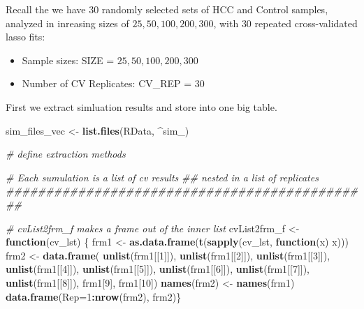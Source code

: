 \documentclass[
]{book}
\newenvironment{Shaded}{\begin{snugshade}}{\end{snugshade}}
\newcommand{\CommentTok}[1]{\textcolor[rgb]{0.56,0.35,0.01}{\textit{#1}}}
\newcommand{\ControlFlowTok}[1]{\textcolor[rgb]{0.13,0.29,0.53}{\textbf{#1}}}
\newcommand{\DataTypeTok}[1]{\textcolor[rgb]{0.13,0.29,0.53}{#1}}
\newcommand{\DecValTok}[1]{\textcolor[rgb]{0.00,0.00,0.81}{#1}}
\newcommand{\KeywordTok}[1]{\textcolor[rgb]{0.13,0.29,0.53}{\textbf{#1}}}
\newcommand{\NormalTok}[1]{#1}
\newcommand{\OperatorTok}[1]{\textcolor[rgb]{0.81,0.36,0.00}{\textbf{#1}}}
\newcommand{\StringTok}[1]{\textcolor[rgb]{0.31,0.60,0.02}{#1}}
\begin{document}
Recall the we have \(30\) randomly selected sets of HCC and Control samples,
analyzed in inreasing sizes of \(25, 50, 100, 200, 300\), with
\(30\) repeated cross-validated lasso fits:

\begin{itemize}
\item
  Sample sizes: SIZE = \(25, 50, 100, 200, 300\)
\item
  Number of CV Replicates: CV\_REP = \(30\)
\end{itemize}

First we extract simluation results and store into one big table.

\begin{Shaded}
\begin{Highlighting}[]
\NormalTok{sim\_files\_vec <{-}}\StringTok{ }\KeywordTok{list.files}\NormalTok{(}\StringTok{\textquotesingle{}RData\textquotesingle{}}\NormalTok{, }\StringTok{\textquotesingle{}\^{}sim\_\textquotesingle{}}\NormalTok{)}


\CommentTok{\# define extraction methods}

\CommentTok{\# Each sumulation is a list of cv results }
\CommentTok{\#\# nested in a list of replicates}
\CommentTok{\#\#\#\#\#\#\#\#\#\#\#\#\#\#\#\#\#\#\#\#\#\#\#\#\#\#\#\#\#\#\#\#\#\#\#\#\#\#\#\#\#\#\#\#\#\#}

\CommentTok{\# cvList2frm\_f makes a frame out of the inner list}
\NormalTok{cvList2frm\_f <{-}}\StringTok{ }\ControlFlowTok{function}\NormalTok{(cv\_lst) \{}
\NormalTok{ frm1 <{-}}\StringTok{ }\KeywordTok{as.data.frame}\NormalTok{(}\KeywordTok{t}\NormalTok{(}\KeywordTok{sapply}\NormalTok{(cv\_lst, }\ControlFlowTok{function}\NormalTok{(x) x)))}
\NormalTok{ frm2 <{-}}\StringTok{ }\KeywordTok{data.frame}\NormalTok{(}
  \KeywordTok{unlist}\NormalTok{(frm1[[}\DecValTok{1}\NormalTok{]]), }\KeywordTok{unlist}\NormalTok{(frm1[[}\DecValTok{2}\NormalTok{]]),}
  \KeywordTok{unlist}\NormalTok{(frm1[[}\DecValTok{3}\NormalTok{]]), }\KeywordTok{unlist}\NormalTok{(frm1[[}\DecValTok{4}\NormalTok{]]),}
  \KeywordTok{unlist}\NormalTok{(frm1[[}\DecValTok{5}\NormalTok{]]), }\KeywordTok{unlist}\NormalTok{(frm1[[}\DecValTok{6}\NormalTok{]]),}
  \KeywordTok{unlist}\NormalTok{(frm1[[}\DecValTok{7}\NormalTok{]]), }\KeywordTok{unlist}\NormalTok{(frm1[[}\DecValTok{8}\NormalTok{]]),}
\NormalTok{  frm1[}\DecValTok{9}\NormalTok{], frm1[}\DecValTok{10}\NormalTok{])}
  \KeywordTok{names}\NormalTok{(frm2) <{-}}\StringTok{ }\KeywordTok{names}\NormalTok{(frm1)}
  \KeywordTok{data.frame}\NormalTok{(}\DataTypeTok{Rep=}\DecValTok{1}\OperatorTok{:}\KeywordTok{nrow}\NormalTok{(frm2), frm2)\}}


\end{Highlighting}
\end{Shaded}
\end{document}
